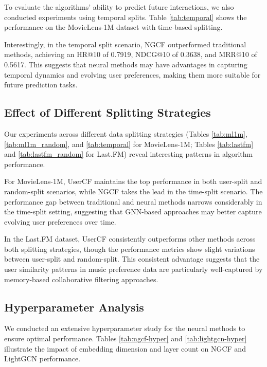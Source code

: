 \documentclass[sigconf,nonacm]{acmart} %
\begin{document}
To evaluate the algorithms' ability to predict future interactions, we also conducted experiments using temporal splits. Table \ref{tab:temporal} shows the performance on the MovieLens-1M dataset with time-based splitting.  

Interestingly, in the temporal split scenario, NGCF outperformed traditional methods, achieving an HR@10 of 0.7919, NDCG@10 of 0.3638, and MRR@10 of 0.5617. This suggests that neural methods may have advantages in capturing temporal dynamics and evolving user preferences, making them more suitable for future prediction tasks.  

\subsection{Effect of Different Splitting Strategies}  

Our experiments across different data splitting strategies (Tables \ref{tab:ml1m}, \ref{tab:ml1m_random}, and \ref{tab:temporal} for MovieLens-1M; Tables \ref{tab:lastfm} and \ref{tab:lastfm_random} for Last.FM) reveal interesting patterns in algorithm performance.   

For MovieLens-1M, UserCF maintains the top performance in both user-split and random-split scenarios, while NGCF takes the lead in the time-split scenario. The performance gap between traditional and neural methods narrows considerably in the time-split setting, suggesting that GNN-based approaches may better capture evolving user preferences over time.  

In the Last.FM dataset, UserCF consistently outperforms other methods across both splitting strategies, though the performance metrics show slight variations between user-split and random-split. This consistent advantage suggests that the user similarity patterns in music preference data are particularly well-captured by memory-based collaborative filtering approaches.  

\subsection{Hyperparameter Analysis}  

We conducted an extensive hyperparameter study for the neural methods to ensure optimal performance. Tables \ref{tab:ngcf-hyper} and \ref{tab:lightgcn-hyper} illustrate the impact of embedding dimension and layer count on NGCF and LightGCN performance.  
\end{document}
